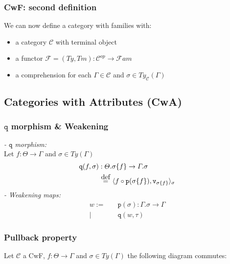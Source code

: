 \documentclass[aspectratio=169]{beamer}
\newcommand\defeq{\stackrel{\mathclap{\normalfont\mbox{def}}}{\ =\ }}
\newcommand{\Fami}{\mathcal{F}am}
\newcommand{\cate}{\mathcal{C}}
\newcommand{\types}{Ty_{\cate}}
\newcommand{\pp}{\texttt{p}}
\newcommand{\qq}{\texttt{q}}
\newcommand{\extension}{\Gamma.\sigma}
\begin{document}
    \begin{frame}
        \frametitle{CwF: second definition}
        We can now define a category with families with:
        \begin{itemize}
            \item a category $\cate$ with terminal object
            \item a functor $\mathcal{F} = (Ty,Tm):\cate^{op}\to \Fami$
            \item a comprehension for each $\Gamma\in\cate$ and $\sigma\in\types(\Gamma)$  
        \end{itemize}
    \end{frame}

    \subsection{Categories with Attributes (CwA)}
    \begin{frame}
        \frametitle{$\qq$ morphism \& Weakening}
        \emph{- $\qq$ morphism:}\\
        Let $f:\Theta\to\Gamma$ and $\sigma\in Ty(\Gamma)$
        \begin{align*}
            \qq(f,\sigma) &: \Theta.\sigma\{f\}\to\Gamma.\sigma\\
            &\defeq \langle f\circ\pp(\sigma\{f\}),\texttt{v}_{\sigma\{f\}}\rangle_\sigma
        \end{align*}
        \emph{- Weakening maps:}
        \begin{align*}
            w :=&\quad \pp(\sigma):\extension\to\Gamma\\
            |&\quad \qq(w,\tau)
        \end{align*}
    \end{frame}

    \begin{frame}
        \frametitle{Pullback property}
        Let $\cate$ a CwF, $f:\Theta\to\Gamma$ and $\sigma\in Ty(\Gamma)$ the following diagram commutes:
        \begin{center}
          \end{center}    
    \end{frame}
\end{document}
